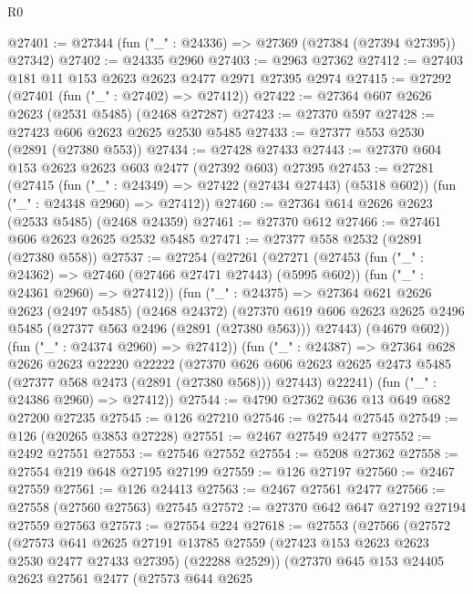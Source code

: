 \begin{lexlean}{R0}
\begin{coremodule}
@27401 := @27344 (fun ("_" : @24336) => @27369 (@27384 (@27394 @27395)) @27342)
@27402 := @24335 @2960
@27403 := @2963 @27362
@27412 := @27403 @181 @11 @153 @2623 @2623 @2477 @2971 @27395 @2974
@27415 := @27292 (@27401 (fun ("_" : @27402) => @27412))
@27422 := @27364 @607 @2626 @2623 (@2531 @5485) (@2468 @27287)
@27423 := @27370 @597
@27428 := @27423 @606 @2623 @2625 @2530 @5485
@27433 := @27377 @553 @2530 (@2891 (@27380 @553))
@27434 := @27428 @27433
@27443 := @27370 @604 @153 @2623 @2623 @603 @2477 (@27392 @603) @27395
@27453 := @27281
    (@27415
      (fun ("_" : @24349) => @27422 (@27434 @27443) (@5318 @602))
      (fun ("_" : @24348 @2960) => @27412))
@27460 := @27364 @614 @2626 @2623 (@2533 @5485) (@2468 @24359)
@27461 := @27370 @612
@27466 := @27461 @606 @2623 @2625 @2532 @5485
@27471 := @27377 @558 @2532 (@2891 (@27380 @558))
@27537 := @27254
    (@27261
      (@27271
        (@27453
          (fun ("_" : @24362) => @27460 (@27466 @27471 @27443) (@5995 @602))
          (fun ("_" : @24361 @2960) => @27412))
        (fun ("_" : @24375) =>
        @27364
          @621
          @2626
          @2623
          (@2497 @5485)
          (@2468 @24372)
          (@27370
            @619
            @606
            @2623
            @2625
            @2496
            @5485
            (@27377 @563 @2496 (@2891 (@27380 @563)))
            @27443)
          (@4679 @602))
        (fun ("_" : @24374 @2960) => @27412))
      (fun ("_" : @24387) =>
      @27364
        @628
        @2626
        @2623
        @22220
        @22222
        (@27370 @626 @606 @2623 @2625 @2473 @5485 (@27377 @568 @2473 (@2891 (@27380 @568))) @27443)
        @22241)
      (fun ("_" : @24386 @2960) => @27412))
@27544 := @4790 @27362 @636 @13 @649 @682 @27200 @27235
@27545 := @126 @27210
@27546 := @27544 @27545
@27549 := @126 (@20265 @3853 @27228)
@27551 := @2467 @27549 @2477
@27552 := @2492 @27551
@27553 := @27546 @27552
@27554 := @5208 @27362
@27558 := @27554 @219 @648 @27195 @27199
@27559 := @126 @27197
@27560 := @2467 @27559
@27561 := @126 @24413
@27563 := @2467 @27561 @2477
@27566 := @27558 (@27560 @27563) @27545
@27572 := @27370 @642 @647 @27192 @27194 @27559 @27563
@27573 := @27554 @224
@27618 := @27553
    (@27566
      (@27572
        (@27573
          @641
          @2625
          @27191
          @13785
          @27559
          (@27423 @153 @2623 @2623 @2530 @2477 @27433 @27395)
          (@22288 @2529))
        (@27370
          @645
          @153
          @24405
          @2623
          @27561
          @2477
          (@27573
            @644
            @2625

\end{coremodule}
\end{lexlean}
